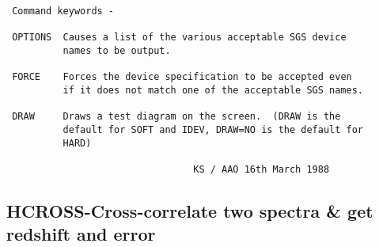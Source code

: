 \begin{description}
\begin{verbatim}
 Command keywords -

 OPTIONS  Causes a list of the various acceptable SGS device
          names to be output.

 FORCE    Forces the device specification to be accepted even
          if it does not match one of the acceptable SGS names.

 DRAW     Draws a test diagram on the screen.  (DRAW is the
          default for SOFT and IDEV, DRAW=NO is the default for
          HARD)

                                 KS / AAO 16th March 1988
\end{verbatim}
\end{description}
\subsection{HCROSS-\label{HCROSS}Cross-correlate two spectra & get redshift and error}
